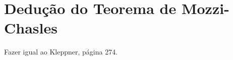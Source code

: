 



\section{Dedução do Teorema de Mozzi-Chasles}
\label{Sec:DeducaoTeoremaDeMozziChasles}

Fazer igual ao Kleppner, página 274.


